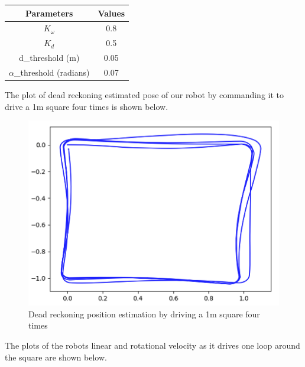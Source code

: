 \documentclass[journal]{IEEEtran}
\begin{document}
\begin{center}
\begin{tabular}{ |c|c| } 
 \hline
 \textbf{Parameters} & \textbf{Values} \\ 
 \hline
 $K_\omega$ & 0.8 \\ 
 \hline
 $K_d$ & 0.5 \\ 
 \hline
 d\_threshold (m) & 0.05 \\
 \hline
 $\alpha$\_threshold (radians)& 0.07 \\
 \hline
\end{tabular}
\end{center}

The plot of dead reckoning estimated pose of our robot by commanding it to drive a 1m square four times is shown below.
\begin{figure}[h]
\begin{center}
\includegraphics[width=0.8\linewidth]{image_1/figure_1_6_1.jpg}
\end{center}
   \caption{Dead reckoning position estimation by driving a 1m square four times}
   \label{figure_1_6_1}
\end{figure}

The plots of the robots linear and rotational velocity as it drives one loop around the square are shown below.
\end{document}
